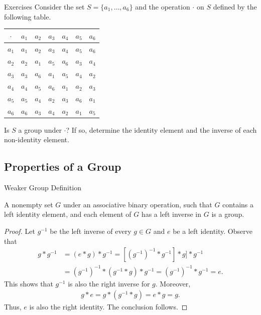 \documentclass{beamer}
\begin{document}
\begin{frame}{Exercises}
Consider the set $S = \{a_1, \dots, a_6\}$ and the operation $\cdot$ on $S$ defined by the following table.
\begin{table}
\begin{tabular}{c|c|c|c|c|c|c}
$\cdot$ & $a_1$ & $a_2$ & $a_3$ & $a_4$ & $a_5$ & $a_6$ \\
\hline
$a_1$ & $a_1$ & $a_2$ & $a_3$ & $a_4$ & $a_5$ & $a_6$ \\
\hline
$a_2$ & $a_2$ & $a_1$ & $a_5$ & $a_6$ & $a_3$ & $a_4$ \\
\hline
$a_3$ & $a_3$ & $a_6$ & $a_1$ & $a_5$ & $a_4$ & $a_2$ \\
\hline
$a_4$ & $a_4$ & $a_5$ & $a_6$ & $a_1$ & $a_2$ & $a_3$ \\
\hline
$a_5$ & $a_5$ & $a_4$ & $a_2$ & $a_3$ & $a_6$ & $a_1$ \\
\hline
$a_6$ & $a_6$ & $a_3$ & $a_4$ & $a_2$ & $a_1$ & $a_5$ \\
\hline
\end{tabular}    
\end{table}
Is $S$ a group under $\cdot$? If so, determine the identity element and the inverse of each non-identity element.
\end{frame}

\subsection{Properties of a Group}

\begin{frame}{Weaker Group Definition}
\begin{theorem}
\justifying
A nonempty set $G$ under an associative binary operation, such that $G$ contains a left identity element, and each element of $G$ has a left inverse in $G$ is a group.
\end{theorem}    
\end{frame}

\begin{frame}
\begin{proof}
\justifying
Let $g^{-1}$ be the left inverse of every $g \in G$ and $e$ be a left identity. Observe that
\begin{align*}
g * g^{-1} &= (e * g) * g^{-1} = \left[\left(g^{-1}\right)^{-1} * g^{-1}\right] * g] * g^{-1} \\ &= \left(g^{-1}\right)^{-1} * \left(g^{-1} * g\right) * g^{-1} = \left(g^{-1}\right)^{-1} * g^{-1} = e. 
\end{align*}
This shows that $g^{-1}$ is also the right inverse for $g$. Moreover,
\begin{align*}
g * e = g * (g^{-1} * g) = e * g = g.    
\end{align*}
Thus, $e$ is also the right identity. The conclusion follows.
\end{proof}
\end{frame}
\end{document}
